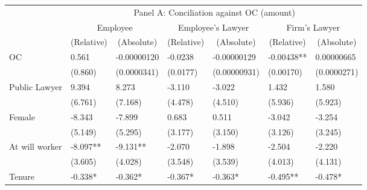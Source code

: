 \begin{tabular}{lcccccc}
      & \multicolumn{6}{c}{Panel A: Conciliation against OC (amount)} \\
\cmidrule{2-7}      & \multicolumn{2}{c}{Employee} & \multicolumn{2}{c}{Employee's Lawyer} & \multicolumn{2}{c}{Firm's Lawyer} \\
\cmidrule{2-7}      & (Relative) & (Absolute) & (Relative) & (Absolute) & (Relative) & (Absolute) \\
\cmidrule{2-7}OC    & \multicolumn{1}{l}{0.561} & \multicolumn{1}{l}{-0.00000120} & \multicolumn{1}{l}{-0.0238} & \multicolumn{1}{l}{-0.00000129} & \multicolumn{1}{l}{-0.00438**} & \multicolumn{1}{l}{0.00000665} \\
      & \multicolumn{1}{l}{(0.860)} & \multicolumn{1}{l}{(0.0000341)} & \multicolumn{1}{l}{(0.0177)} & \multicolumn{1}{l}{(0.00000931)} & \multicolumn{1}{l}{(0.00170)} & \multicolumn{1}{l}{(0.0000271)} \\
Public Lawyer & \multicolumn{1}{l}{9.394} & \multicolumn{1}{l}{8.273} & \multicolumn{1}{l}{-3.110} & \multicolumn{1}{l}{-3.022} & \multicolumn{1}{l}{1.432} & \multicolumn{1}{l}{1.580} \\
      & \multicolumn{1}{l}{(6.761)} & \multicolumn{1}{l}{(7.168)} & \multicolumn{1}{l}{(4.478)} & \multicolumn{1}{l}{(4.510)} & \multicolumn{1}{l}{(5.936)} & \multicolumn{1}{l}{(5.923)} \\
Female & \multicolumn{1}{l}{-8.343} & \multicolumn{1}{l}{-7.899} & \multicolumn{1}{l}{0.683} & \multicolumn{1}{l}{0.511} & \multicolumn{1}{l}{-3.042} & \multicolumn{1}{l}{-3.254} \\
      & \multicolumn{1}{l}{(5.149)} & \multicolumn{1}{l}{(5.295)} & \multicolumn{1}{l}{(3.177)} & \multicolumn{1}{l}{(3.150)} & \multicolumn{1}{l}{(3.126)} & \multicolumn{1}{l}{(3.245)} \\
At will worker & \multicolumn{1}{l}{-8.097**} & \multicolumn{1}{l}{-9.131**} & \multicolumn{1}{l}{-2.070} & \multicolumn{1}{l}{-1.898} & \multicolumn{1}{l}{-2.504} & \multicolumn{1}{l}{-2.220} \\
      & \multicolumn{1}{l}{(3.605)} & \multicolumn{1}{l}{(4.028)} & \multicolumn{1}{l}{(3.548)} & \multicolumn{1}{l}{(3.539)} & \multicolumn{1}{l}{(4.013)} & \multicolumn{1}{l}{(4.131)} \\
Tenure & \multicolumn{1}{l}{-0.338*} & \multicolumn{1}{l}{-0.362*} & \multicolumn{1}{l}{-0.367*} & \multicolumn{1}{l}{-0.363*} & \multicolumn{1}{l}{-0.495**} & \multicolumn{1}{l}{-0.478*} \\

\end{tabular}
